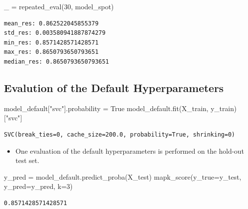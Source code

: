 \documentclass[
  letterpaper,
  DIV=11,
  numbers=noendperiod]{scrreprt}
\newenvironment{Shaded}{\begin{snugshade}}{\end{snugshade}}
\newcommand{\DecValTok}[1]{\textcolor[rgb]{0.68,0.00,0.00}{#1}}
\newcommand{\NormalTok}[1]{\textcolor[rgb]{0.00,0.23,0.31}{#1}}
\newcommand{\OperatorTok}[1]{\textcolor[rgb]{0.37,0.37,0.37}{#1}}
\newcommand{\StringTok}[1]{\textcolor[rgb]{0.13,0.47,0.30}{#1}}
\newcommand{\VariableTok}[1]{\textcolor[rgb]{0.07,0.07,0.07}{#1}}
\providecommand{\tightlist}{%
  \setlength{\itemsep}{0pt}\setlength{\parskip}{0pt}}\usepackage{longtable,booktabs,array}
\begin{document}
\begin{Shaded}
\begin{Highlighting}[]
\NormalTok{\_ }\OperatorTok{=}\NormalTok{ repeated\_eval(}\DecValTok{30}\NormalTok{, model\_spot)}
\end{Highlighting}
\end{Shaded}

\begin{verbatim}
mean_res: 0.862522045855379
std_res: 0.003580941887874279
min_res: 0.8571428571428571
max_res: 0.8650793650793651
median_res: 0.8650793650793651
\end{verbatim}

\hypertarget{evalution-of-the-default-hyperparameters-2}{%
\subsection{Evalution of the Default
Hyperparameters}\label{evalution-of-the-default-hyperparameters-2}}

\begin{Shaded}
\begin{Highlighting}[]
\NormalTok{model\_default[}\StringTok{"svc"}\NormalTok{].probability }\OperatorTok{=} \VariableTok{True}
\NormalTok{model\_default.fit(X\_train, y\_train)[}\StringTok{"svc"}\NormalTok{]}
\end{Highlighting}
\end{Shaded}

\begin{verbatim}
SVC(break_ties=0, cache_size=200.0, probability=True, shrinking=0)
\end{verbatim}

\begin{itemize}
\tightlist
\item
  One evaluation of the default hyperparameters is performed on the
  hold-out test set.
\end{itemize}

\begin{Shaded}
\begin{Highlighting}[]
\NormalTok{y\_pred }\OperatorTok{=}\NormalTok{ model\_default.predict\_proba(X\_test)}
\NormalTok{mapk\_score(y\_true}\OperatorTok{=}\NormalTok{y\_test, y\_pred}\OperatorTok{=}\NormalTok{y\_pred, k}\OperatorTok{=}\DecValTok{3}\NormalTok{)}
\end{Highlighting}
\end{Shaded}

\begin{verbatim}
0.8571428571428571
\end{verbatim}
\end{document}
